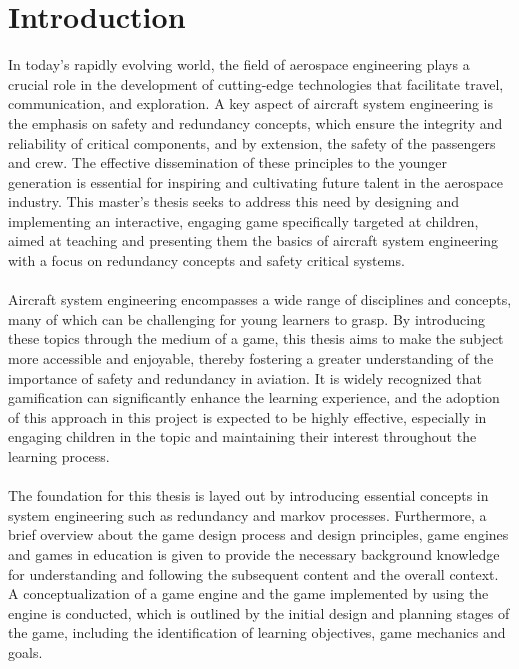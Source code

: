 
\chapter{Introduction}\label{ch:introduction}
In today's rapidly evolving world, the field of aerospace engineering plays a crucial role in the development of
cutting-edge technologies that facilitate travel, communication, and exploration.
A key aspect of aircraft system engineering is the emphasis on safety and redundancy concepts,
which ensure the integrity and reliability of critical components, and by extension, the safety of the passengers and crew.
The effective dissemination of these principles to the younger generation is essential for inspiring and cultivating future
talent in the aerospace industry.
This master's thesis seeks to address this need by designing and implementing an interactive,
engaging game specifically targeted at children, aimed at teaching and presenting them the basics of
aircraft system engineering with a focus on redundancy concepts and safety critical systems.
\\
\\
Aircraft system engineering encompasses a wide range of disciplines and concepts, many of which can be challenging for young learners to grasp.
By introducing these topics through the medium of a game,
this thesis aims to make the subject more accessible and enjoyable,
thereby fostering a greater understanding of the importance of safety and redundancy in aviation.
It is widely recognized that gamification can significantly enhance the learning experience,
and the adoption of this approach in this project is expected to be highly effective,
especially in engaging children in the topic and maintaining their interest throughout the learning process.
\\
\\
The foundation for this thesis is layed out by introducing essential concepts in system engineering such as redundancy and markov processes.
Furthermore, a brief overview about the game design process and design principles, game engines and games in education is given to
provide the necessary background knowledge for understanding and following the subsequent content and the overall context.
A conceptualization of a game engine and the game implemented by using the engine is conducted, which is outlined by the initial
design and planning stages of the game, including the identification of learning objectives, game mechanics and goals.
